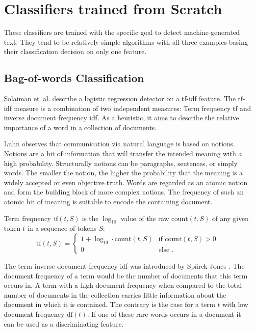     \section{Classifiers trained from Scratch}
    \label{sec:fromScratch}
    These classifiers are trained with the specific goal to detect machine-generated text.
    They tend to be relatively simple algorithms with all three examples basing their classification decision on only one feature.
    
    \subsection{Bag-of-words Classification}
    Solaiman et~al. \cite{solaiman2019release} describe a logistic regression detector on a tf-idf feature.
    The tf-idf measure is a combination of two independent measures: Term frequency tf and inverse document frequency idf.
    As a heuristic, it aims to describe the relative importance of a word in a collection of documents.

    Luhn \cite{luhn1957statistical} observes that communication via natural language is based on notions.
    Notions are a bit of information that will transfer the intended meaning with a high probability.
    Structurally notions can be paragraphs, sentences, or simply words.
    The smaller the notion, the higher the probability that the meaning is a widely accepted or even objective truth.
    Words are regarded as an atomic notion and form the building block of more complex notions.
    The frequency of such an atomic bit of meaning is suitable to encode the containing document.

    \begin{definition}
    \label{def:tf}
        Term frequency $\mathrm{tf}(t,S)$ is the $\log_{10}$ value of the raw $\mathrm{count}(t,S)$ of any given token $t$ in a sequence of tokens $S$:
        \begin{equation}
            \mathrm{tf}(t,S) = 
                \begin{cases}
                    1 + \log_{10} \cdot \mathrm{count}(t,S) & \text{if $\mathrm{count}(t,S) > 0$} \\
                    0 & \text{else .} 
                \end{cases}
        \end{equation}
    \end{definition}

    The term inverse document frequency idf was introduced by Spärck Jones \cite{sparckjones1972statistical}.
    The document frequency of a term would be the number of documents that this term occurs in.
    A term with a high document frequency when compared to the total number of documents in the collection carries little information about the document in which it is contained.
    The contrary is the case for a term $t$ with low document frequency $\mathrm{df}(t)$.
    If one of these rare words occurs in a document it can be used as a discriminating feature.

